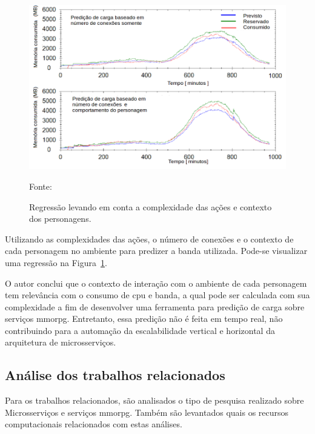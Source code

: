 \begin{figure}[htb!]
\caption{Regressão levando em conta a complexidade das ações e contexto dos personagens.}
\label{fig:regressao_complexidade}
\includegraphics[width=\textwidth]{img/cap2/network_regressao_complexidade.png}
\centering

Fonte:~\cite{6374456}
\end{figure}


Utilizando as complexidades das ações, o número de conexões e o contexto de cada personagem no ambiente para predizer a banda utilizada.
%
Pode-se visualizar uma regressão na Figura~\ref{fig:regressao_complexidade}.



O autor conclui que o contexto de interação com o ambiente de cada personagem tem relevância com o consumo de \ac{cpu} e banda, a qual pode ser calculada com sua complexidade a fim de desenvolver uma ferramenta para predição de carga sobre serviços \ac{mmorpg}.
%
Entretanto, essa predição não é feita em tempo real, não contribuindo para a automação da escalabilidade vertical e horizontal da arquitetura de microsserviços.



\subsection{Análise dos trabalhos relacionados}
\label{sec:similares_analise}



Para os trabalhos relacionados, são analisados o tipo de pesquisa realizado sobre Microsserviços e serviços \ac{mmorpg}.
%
Também são levantados quais os recursos computacionais relacionados com estas análises.


